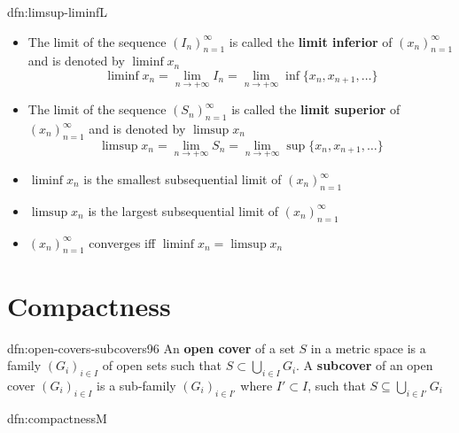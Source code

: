 \documentclass[landscape, 8pt]{extarticle}
\begin{document}
\begin{multicols}{3}
\begin{dfn}{dfn:limsup-liminf}{L}
    \vspace{-8pt}

    \begin{itemize}[leftmargin=*]
        \item The limit of the sequence $(I_{n})^{\infty}_{n=1}$ is called the \textbf{limit inferior} of $(x_{n})^{\infty}_{n=1}$ and is denoted by $\liminf x_{n}$
            \[\liminf x_{n} = \lim_{n\to +\infty} I_{n} = \lim_{n\to +\infty} \inf \{x_{n}, x_{n+1},\dots\}\]
        \item The limit of the sequence $(S_{n})^{\infty}_{n=1}$ is called the \textbf{limit superior} of $(x_{n})^{\infty}_{n=1}$ and is denoted by $\limsup x_{n}$
            \[\limsup x_{n} = \lim_{n\to +\infty} S_{n} = \lim_{n\to +\infty} \sup \{x_{n}, x_{n+1},\dots\}\]
    \end{itemize}

    \longrule{0.08ex}
    \vspace{-14pt}
    \begin{itemize}[leftmargin=*]
        \item $\liminf x_{n}$ is the smallest subsequential limit of $(x_{n})^{\infty}_{n=1}$
        \item $\limsup x_{n}$ is the largest subsequential limit of $(x_{n})^{\infty}_{n=1}$
        \item $(x_{n})^{\infty}_{n=1}$ converges iff $\liminf x_{n} = \limsup x_{n}$
    \end{itemize}
\end{dfn}

\vspace{-16pt}
\section{Compactness}

\begin{dfn}{dfn:open-covers-subcovers}{96}
    \vspace{-5pt}
    An \textbf{open cover} of a set $S$ in a metric space is a family $(G_{i})_{i\in I}$ of open sets such that $S \subset \bigcup\limits_{i \in I} G_{i}$. A \textbf{subcover} of an open cover $(G_{i})_{i\in I}$ is a sub-family $(G_{i})_{i\in I'}$ where $I' \subset I$, such that $S \subseteq \bigcup_{i\in I'} G_{i}$
\end{dfn}

\begin{dfn}{dfn:compactness}{M}
    \vspace{-5pt}


\end{dfn}
\end{multicols}
\end{document}
